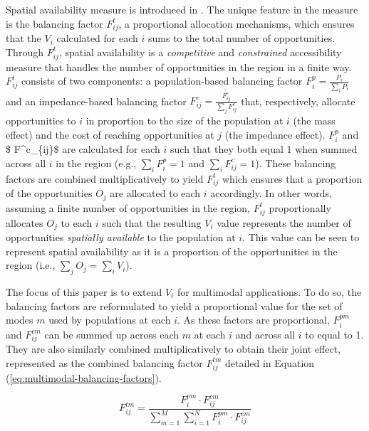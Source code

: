 \documentclass[]{trbunofficial}
\begin{document}
Spatial availability measure is introduced in
\citet{soukhovIntroducingSpatialAvailability2023}. The unique feature in
the measure is the balancing factor \(F^t_{ij}\), a proportional
allocation mechanisms, which ensures that the \(V_i\) calculated for
each \(i\) sums to the total number of opportunities. Through
\(F^t_{ij}\), spatial availability is a \emph{competitive} and
\emph{constrained} accessibility measure that handles the number of
opportunities in the region in a finite way. \(F^t_{ij}\) consists of
two components: a population-based balancing factor
\(F^p_{i} = \frac{P_i}{\sum_i P_i}\) and an impedance-based balancing
factor \(F^c_{ij} = \frac{F^c_{ij}}{\sum_j F^c_{ij}}\) that,
respectively, allocate opportunities to \(i\) in proportion to the size
of the population at \(i\) (the mass effect) and the cost of reaching
opportunities at \(j\) (the impedance effect). \(F^p_{i}\) and \$
F\^{}c\_\{ij\}\$ are calculated for each \(i\) such that they both equal
1 when summed across all \(i\) in the region (e.g.,
\(\sum_i F^p_{i} = 1\) and \(\sum_i F^c_{ij} = 1\)). These balancing
factors are combined multiplicatively to yield \(F^t_{ij}\) which
ensures that a proportion of the opportunities \(O_j\) are allocated to
each \(i\) accordingly. In other words, assuming a finite number of
opportunities in the region, \(F^t_{ij}\) proportionally allocates
\(O_j\) to each \(i\) such that the resulting \(V_i\) value represents
the number of opportunities \emph{spatially available} to the population
at \(i\). This value can be seen to represent spatial availability as it
is a proportion of the opportunities in the region (i.e.,
\(\sum_j O_j = \sum_i V_i\)).

The focus of this paper is to extend \(V_i\) for multimodal
applications. To do so, the balancing factors are reformulated to yield
a proportional value for the set of modes \(m\) used by populations at
each \(i\). As these factors are proportional, \(F^{pm}_{i}\) and
\(F^{cm}_{ij}\) can be summed up across each \(m\) at each \(i\) and
across all \(i\) to equal to 1. They are also similarly combined
multiplicatively to obtain their joint effect, represented as the
combined balancing factor \(F^{tm}_{ij}\) detailed in Equation
(\ref{eq:multimodal-balancing-factors}).

\begin{equation}
\label{eq:multimodal-balancing-factors}
F^{tm}_{ij} = \frac{F^{pm}_{i} \cdot F^{cm}_{ij}}{\sum_{m=1}^M \sum_{i=1}^N F^{pm}_{i} \cdot F^{cm}_{ij}}
\end{equation}
\end{document}
